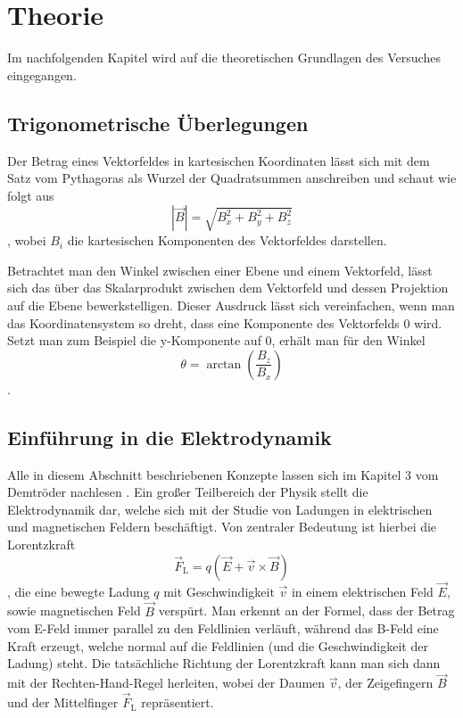 \section{Theorie}
\label{sec:theorie}
Im nachfolgenden Kapitel wird auf die theoretischen Grundlagen des Versuches eingegangen.

\subsection{Trigonometrische Überlegungen}
Der Betrag eines Vektorfeldes in kartesischen Koordinaten lässt sich mit dem Satz vom Pythagoras als Wurzel der Quadratsummen anschreiben und schaut wie folgt aus
\begin{equation}\label{eqn:Babs}
	|\vec{B}| = \sqrt{B_x^2 + B_y^2 + B_z^2}
\end{equation}
, wobei \( B_i \) die kartesischen Komponenten des Vektorfeldes darstellen.

Betrachtet man den Winkel zwischen einer Ebene und einem Vektorfeld, lässt sich das über das Skalarprodukt zwischen dem Vektorfeld und dessen Projektion auf die Ebene bewerkstelligen. Dieser Ausdruck lässt sich vereinfachen, wenn man das Koordinatensystem so dreht, dass eine Komponente des Vektorfelds 0 wird. Setzt man zum Beispiel die y-Komponente auf 0, erhält man für den Winkel 
\begin{equation}\label{eqn:theta}
	\theta = \arctan(\frac{B_z}{B_x})
\end{equation}
.

\subsection{Einführung in die Elektrodynamik}
Alle in diesem Abschnitt beschriebenen Konzepte lassen sich im Kapitel 3 vom Demtröder nachlesen \cite{demtröder}.
Ein großer Teilbereich der Physik stellt die Elektrodynamik dar, welche sich mit der Studie von Ladungen in elektrischen und magnetischen Feldern beschäftigt. Von zentraler Bedeutung ist hierbei die Lorentzkraft 
\begin{equation}\label{eqn:FL}
	\vec{F}_{\text{L}} = q\left(\vec{E} + \vec{v} \times \vec{B}\right)
\end{equation}
, die eine bewegte Ladung \( q \) mit Geschwindigkeit \( \vec{v} \) in einem elektrischen Feld \( \vec{E} \), sowie magnetischen Feld \( \vec{B} \) verspürt. Man erkennt an der Formel, dass der Betrag vom E-Feld immer parallel zu den Feldlinien verläuft, während das B-Feld eine Kraft erzeugt, welche normal auf die Feldlinien (und die Geschwindigkeit der Ladung) steht. Die tatsächliche Richtung der Lorentzkraft kann man sich dann mit der Rechten-Hand-Regel herleiten, wobei der Daumen \( \vec{v} \), der Zeigefingern \( \vec{B} \) und der Mittelfinger \( \vec{F}_{\text{L}} \) repräsentiert. 

